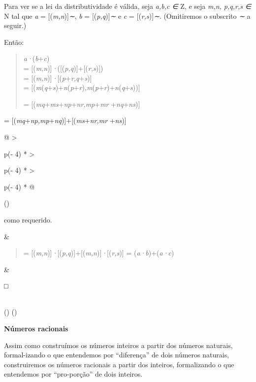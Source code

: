 \documentclass[
]{article}
\begin{document}
Para ver se a lei da distributividade é válida, seja \emph{a,b,c ∈} Z, e
seja \emph{m,n, p,q,r,s ∈} N tal que \emph{a} =
{[}(\emph{m,n}){]}\emph{∼}, \emph{b} = {[}(\emph{p,q}){]}\emph{∼} e
\emph{c} = {[}(\emph{r,s}){]}\emph{∼}. (Omitiremos o subscrito \emph{∼}
a seguir.)

Então:

\begin{quote}
\emph{a·}(\emph{b}+\emph{c})\\
= {[}(\emph{m,n}){]}\emph{·}({[}(\emph{p,q}){]}+{[}(\emph{r,s}){]})\\
= {[}(\emph{m,n}){]}\emph{·}{[}(\emph{p}+\emph{r,q}+\emph{s}){]}\\
=
{[}(\emph{m}(\emph{q}+\emph{s})+\emph{n}(\emph{p}+\emph{r})\emph{,m}(\emph{p}+\emph{r})+\emph{n}(\emph{q}+\emph{s})){]}

= {[}(\emph{mq}+\emph{ms}+\emph{np}+\emph{nr,mp}+\emph{mr}
+\emph{nq}+\emph{ns}){]}
\end{quote}

= {[}(\emph{mq}+\emph{np,mp}+\emph{nq}){]}+{[}(\emph{ms}+\emph{nr,mr}
+\emph{ns}){]}

\begin{longtable}[]{@{}
  >{\raggedright\arraybackslash}p{(\columnwidth - 4\tabcolsep) * }
  >{\raggedright\arraybackslash}p{(\columnwidth - 4\tabcolsep) * }
  >{\raggedright\arraybackslash}p{(\columnwidth - 4\tabcolsep) * }@{}}
\toprule()
\begin{minipage}[b]{\linewidth}\raggedright
como requerido.
\end{minipage} & \begin{minipage}[b]{\linewidth}\raggedright
\begin{quote}
=
{[}(\emph{m,n}){]}\emph{·}{[}(\emph{p,q}){]}+{[}(\emph{m,n}){]}\emph{·}{[}(\emph{r,s}){]}
= (\emph{a·b})+(\emph{a·c})
\end{quote}
\end{minipage} & \begin{minipage}[b]{\linewidth}\raggedright
□
\end{minipage} \\
\midrule()
\endhead
\bottomrule()
\end{longtable}

\textbf{Números racionais}

Assim como construímos os números inteiros a partir dos números
naturais, formal-izando o que entendemos por ``diferença'' de dois
números naturais, construiremos os números racionais a partir dos
inteiros, formalizando o que entendemos por ``pro-porção'' de dois
inteiros.
\end{document}

